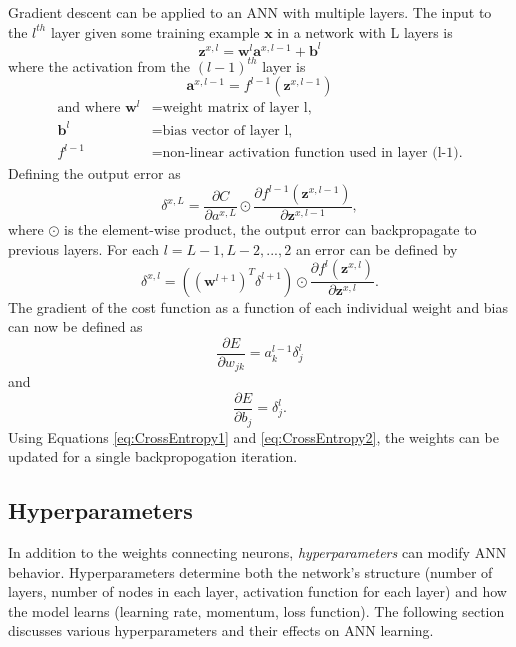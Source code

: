 Gradient descent can be applied to an ANN with multiple layers. The input to the $l^{th}$ layer given some training example $\boldsymbol{x}$ in a network with L layers is 
\begin{equation}
\boldsymbol{z}^{x,l} = \boldsymbol{w}^{l}  \boldsymbol{a}^{x,l-1} + \boldsymbol{b}^{l}
\end{equation}
%
where the activation from the $(l-1)^{th}$ layer is
%
\begin{equation}
\boldsymbol{a}^{x,l-1} = f^{l-1}(\boldsymbol{z}^{x,l-1})
\end{equation}
\begin{align*}
  \text{and where } \boldsymbol{w}^{l} &= \text{weight matrix of layer l,} \\
  \boldsymbol{b}^{l} &= \text{bias vector of layer l,} \\
  f^{l-1} &= \text{non-linear activation function used in layer (l-1).}
\end{align*}
%
Defining the output error as 
%
\begin{equation}
\delta^{x,L} = \frac{\partial C}{\partial a^{x,L}} \odot \frac{\partial f^{l-1}(\boldsymbol{z}^{x,l-1}) }{\partial \boldsymbol{z}^{x,l-1}}, 
\end{equation}
%
where $\odot$ is the element-wise product, the output error can backpropagate to previous layers. For each $l=L-1,L-2,...,2$ an error can be defined by
%
\begin{equation}
\delta^{x,l} = ((\boldsymbol{w}^{l+1})^T \delta^{l+1}) \odot \frac{\partial f^{l}(\boldsymbol{z}^{x,l}) }{\partial \boldsymbol{z}^{x,l}}.
\end{equation}
%
The gradient of the cost function as a function of each individual weight and bias can now be defined as 
%
\begin{equation} \label{eq:CrossEntropy1}
\frac{\partial E}{\partial w_{jk}} = a^{l-1}_k \delta^l_j
\end{equation}
%
and 
%
\begin{equation} \label{eq:CrossEntropy2}
\frac{\partial E}{\partial b_j} = \delta^l_j.
\end{equation}
%
Using Equations \ref{eq:CrossEntropy1} and \ref{eq:CrossEntropy2}, the weights can be updated for a single backpropogation iteration. 


\subsection{Hyperparameters}

In addition to the weights connecting neurons, \textit{hyperparameters} can modify ANN behavior. Hyperparameters determine both the network's structure (number of layers, number of nodes in each layer, activation function for each layer) and how the model learns (learning rate, momentum, loss function). The following section discusses various hyperparameters and their effects on ANN learning.


